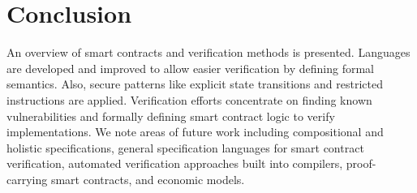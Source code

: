 \section{Conclusion}
\label{conclusion}
An overview of smart contracts and verification methods is presented.
Languages are developed and improved to allow easier verification by defining formal semantics. Also, secure patterns like explicit state transitions and restricted instructions are applied. Verification efforts concentrate on finding known vulnerabilities and formally defining smart contract logic to verify implementations.
We note areas of future work including compositional and holistic specifications, general specification languages for smart contract verification, automated verification approaches built into compilers, proof-carrying smart contracts, and economic models.


